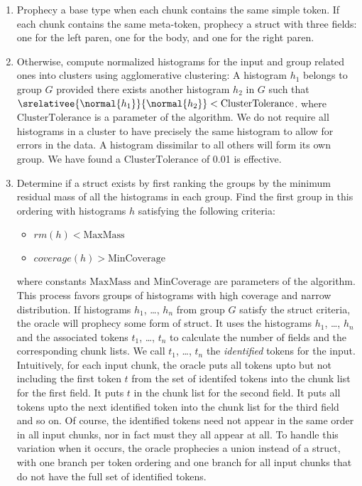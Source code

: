 \begin {enumerate}
\item Prophecy a base type when each chunk contains the same simple
  token. If each chunk contains the same meta-token, prophecy a struct
  with three fields: one for the left paren, one for the body, and one
  for the right paren.

\item Otherwise, compute normalized histograms for the input and group
  related ones into clusters using agglomerative clustering:  A
  histogram $h_1$ belongs to group $G$ provided there exists another
  histogram $h_2$ in $G$ such  that
  $\srelativee{\normal{h_1}}{\normal{h_2}} <  \mathrm{ClusterTolerance}$.  
  where $\mathrm{ClusterTolerance}$ is a parameter of the algorithm. We do not
  require all histograms in a cluster to 
  have precisely the same histogram to allow for errors in the data.
  A histogram dissimilar to all others will form its own group.
  We have found a $\mathrm{ClusterTolerance}$ of 0.01 is effective.  

\item Determine if a struct exists by first ranking the groups by the
  minimum residual mass of all the histograms in each group. Find the first group in this
  ordering with histograms $h$ satisfying the following criteria:
\begin {itemize}
\item $\mathit{rm}(h) < \mathrm{MaxMass}$
\item $\mathit{coverage}(h) > \mathrm{MinCoverage}$
\end{itemize}
where constants $\mathrm{MaxMass}$ and $\mathrm{MinCoverage}$ are
parameters of the algorithm.  
This process favors groups of histograms with high
coverage and narrow distribution.  
If histograms $h_1$, \ldots, $h_n$ from
group $G$ satisfy the struct criteria, the oracle will prophecy some
form of struct. It uses the histograms $h_1$, \ldots, $h_n$ and the associated
tokens $t_1$, \ldots, $t_n$ to calculate the number of fields and the
corresponding chunk lists.  We call $t_1$, \ldots, $t_n$ the {\em
  identified} tokens for the input.
Intuitively, for each input chunk, the oracle puts
all tokens upto but not including the first token $t$ from the set of
identifed tokens into the chunk list for the first field.  It puts $t$ in
the chunk list for the second field. It puts all tokens upto the next
identified token into the chunk list for the third field and so on. Of
course, the identified tokens need not appear in the same order in all
input chunks, nor in fact must they all appear at all.  To handle
this variation when it occurs, the oracle prophecies a union instead
of a struct, with one branch per token ordering and one branch for all
input chunks that do not have the full set of identified tokens.



\end{enumerate}

